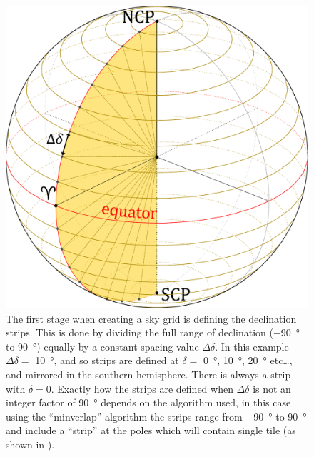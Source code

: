\begin{colsection}
\begin{colsection}
\begin{figure}[p]
    \begin{center}
        \includegraphics[width=\linewidth]{images/globe2.pdf}
    \end{center}
    \caption[Defining declination strips]{
        The first stage when creating a sky grid is defining the declination strips. This is done by dividing the full range of declination (\SI{-90}{\degree} to \SI{90}{\degree}) equally by a constant spacing value $\Delta\delta$. In this example $\Delta\delta =$ \SI{10}{\degree}, and so strips are defined at $\delta=$ \SI{0}{\degree}, \SI{10}{\degree}, \SI{20}{\degree} etc\ldots, and mirrored in the southern hemisphere. There is always a strip with $\delta=0$. Exactly how the strips are defined when $\Delta\delta$ is not an integer factor of \SI{90}{\degree} depends on the algorithm used, in this case using the ``minverlap'' algorithm the strips range from \SI{-90}{\degree} to \SI{90}{\degree} and include a ``strip'' at the poles which will contain single tile (as shown in ).
    }\label{fig:deltadelta}
\end{figure}


\end{colsection}
\end{colsection}
